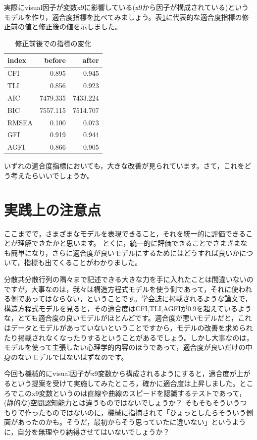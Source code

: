 \documentclass{ltjsbook}
\begin{document}
実際にvisual因子が変数x9に影響している(x9から因子が構成されている)というモデルを作り，適合度指標を比べてみましょう。表\ref{tbl:13_02}に代表的な適合度指標の修正前の値と修正後の値を示しました。
\begin{table}[ht]
	\caption{修正前後での指標の変化}
	\centering
	\begin{tabular}[t]{l|rr}
		\hline
		index & before   & after    \\\hline
		CFI   & 0.895    & 0.945    \\
		TLI   & 0.856    & 0.923    \\
		AIC   & 7479.335 & 7433.224 \\
		BIC   & 7557.115 & 7514.707 \\
		RMSEA & 0.100    & 0.073    \\
		GFI   & 0.919    & 0.944    \\
		AGFI  & 0.866    & 0.905    \\
		\hline
	\end{tabular}
	\label{tbl:13_02}
\end{table}
いずれの適合度指標においても，大きな改善が見られています。さて，これをどう考えたらいいでしょうか。

\section{実践上の注意点}
ここまでで，さまざまなモデルを表現できること，それを統一的に評価できることが理解できたかと思います。
とくに，統一的に評価できることでさまざまなも簡単になり，さらに適合度が良いモデルにするためにはどうすれば良いかについて，指標も出てくることがわかりました。

分散共分散行列の隅々まで記述できる大きな力を手に入れたことは間違いないのですが，大事なのは，我々は構造方程式モデルを使う側であって，それに使われる側であってはならない，ということです。学会誌に掲載されるような論文で，構造方程式モデルを見ると，その適合度はCFI,TLI,AGFIが0.9を超えているような，とても適合度の良いモデルがほとんどです。適合度が悪いモデルだと，これはデータとモデルがあっていないということですから，モデルの改善を求められたり掲載されなくなったりするということがあるでしょう。しかし大事なのは，モデルを使って主張したい心理学的内容のほうであって，適合度が良いだけの中身のないモデルではないはずなのです。

今回も機械的にvisual因子がx9変数から構成されるようにすると，適合度が上がるという提案を受けて実施してみたところ，確かに適合度は上昇しました。ところでこのx9変数というのは直線や曲線のスピードを認識するテストであって，(静的な)空間認知能力とは違うものではないでしょうか？ そもそもそういうつもりで作ったものではないのに，機械に指摘されて「ひょっとしたらそういう側面があったのかも。そうだ，最初からそう思っていたに違いない」というように，自分を無理やり納得させてはいないでしょうか？
\end{document}
